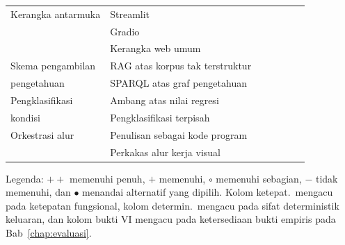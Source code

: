 \begin{longtable}{@{}p{2.5cm}p{3.2cm}p{1.1cm}p{1.1cm}p{1.15cm}p{1.2cm}p{1.1cm}@{}}
Kerangka antarmuka & Streamlit         & & & & & \\
                   & Gradio            & & & & & \\
                   & Kerangka web umum & & & & & \\
\midrule

Skema pengambilan & RAG atas korpus tak terstruktur & & & & & \\
pengetahuan       & SPARQL atas graf pengetahuan    & & & & & \\
\midrule

Pengklasifikasi & Ambang atas nilai regresi & & & & & \\
kondisi         & Pengklasifikasi terpisah  & & & & & \\
\midrule

Orkestrasi alur & Penulisan sebagai kode program & & & & & \\
                & Perkakas alur kerja visual     & & & & & \\

\end{longtable}

\noindent\footnotesize Legenda: $++$ memenuhi penuh, $+$ memenuhi, $\circ$ memenuhi sebagian, $-$ tidak memenuhi, dan $\bullet$ menandai alternatif yang dipilih. Kolom ketepat.\ mengacu pada ketepatan fungsional, kolom determin.\ mengacu pada sifat deterministik keluaran, dan kolom bukti VI mengacu pada ketersediaan bukti empiris pada Bab~\ref{chap:evaluasi}.\normalsize
